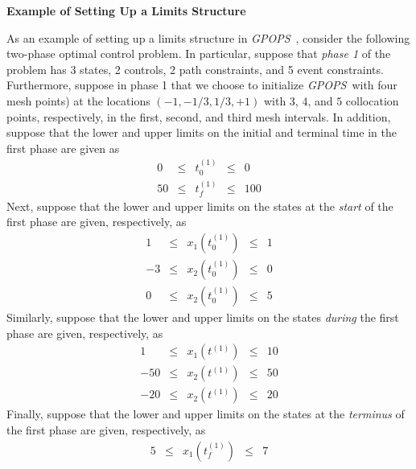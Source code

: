 \documentclass[10pt]{article}
\newcommand{\gpops}{{\em GPOPS}~}
\newenvironment{shadedframe}{%
  \def\FrameCommand{\fcolorbox{black}{shadecolor}}%
  \MakeFramed {\FrameRestore}}
{\endMakeFramed}
\begin{document}
\scriptsize
\begin{shadedframe}
{\noindent}{\bf Example of Setting Up a Limits Structure}
\vspace{12pt}

As an example of setting up a limits structure in \gpops,
consider the following two-phase optimal control problem.  In
particular, suppose that {\em phase 1} of the problem has 3 states, 2
controls, 2 path constraints, and 5 event constraints.  Furthermore,
suppose in phase 1 that we choose to initialize \gpops with four mesh
points) at the locations $(-1,-1/3,1/3,+1)$ with $3$, $4$, and $5$
collocation points, respectively, in the first, second, and third mesh
intervals.  In addition, suppose that the lower and upper limits on
the initial and terminal time in the first phase are given as 
\begin{displaymath}
 \begin{array}{rcccr}
   0 & \leq  & t_0^{(1)} & \leq & 0 \\
   50 & \leq & t_f^{(1)} & \leq & 100
 \end{array}
\end{displaymath}
Next, suppose that the lower and upper limits on the states at the
{\em start} of the first phase are given, respectively, as
\begin{displaymath}
 \begin{array}{rcccr}
   1 & \leq & x_1(t_0^{(1)}) & \leq & 1 \\
   -3 & \leq & x_2(t_0^{(1)}) & \leq & 0 \\
   0 & \leq & x_2(t_0^{(1)}) & \leq & 5
 \end{array}
\end{displaymath}
Similarly, suppose that the lower and upper limits on the states
{\em during}  the first phase are given, respectively, as
\begin{displaymath}
 \begin{array}{rcccr}
   1 & \leq & x_1(t^{(1)}) & \leq & 10 \\
   -50 & \leq & x_2(t^{(1)}) & \leq & 50 \\
   -20 & \leq & x_2(t^{(1)}) & \leq & 20
 \end{array}
\end{displaymath}
Finally, suppose that the lower and upper limits on the states at the
{\em terminus} of the first phase are given, respectively, as
\begin{displaymath}
 \begin{array}{rcccr}
   5 & \leq & x_1(t_f^{(1)}) & \leq & 7 \\

\end{array}
\end{displaymath}
\end{shadedframe}
\end{document}
